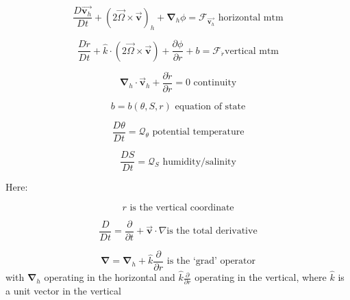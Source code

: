 \documentclass[12pt]{book}
\begin{document}

\begin{equation*}
\frac{D\vec{\mathbf{v}_{h}}}{Dt}+\left( 2\vec{\Omega}\times \vec{\mathbf{v}}
\right) _{h}+\mathbf{\nabla }_{h}\phi =\mathcal{F}_{\vec{\mathbf{v}_{h}}}
\text{ horizontal mtm}
\end{equation*}

\begin{equation*}
\frac{D\dot{r}}{Dt}+\widehat{k}\cdot \left( 2\vec{\Omega}\times \vec{\mathbf{
v}}\right) +\frac{\partial \phi }{\partial r}+b=\mathcal{F}_{\dot{r}}\text{
vertical mtm}
\end{equation*}

\begin{equation}
\mathbf{\nabla }_{h}\cdot \vec{\mathbf{v}}_{h}+\frac{\partial \dot{r}}{
\partial r}=0\text{ continuity}  \label{eq:continuous}
\end{equation}

\begin{equation*}
b=b(\theta ,S,r)\text{ equation of state}
\end{equation*}

\begin{equation*}
\frac{D\theta }{Dt}=\mathcal{Q}_{\theta }\text{ potential temperature}
\end{equation*}

\begin{equation*}
\frac{DS}{Dt}=\mathcal{Q}_{S}\text{ humidity/salinity}
\end{equation*}

Here:

\begin{equation*}
r\text{ is the vertical coordinate}
\end{equation*}

\begin{equation*}
\frac{D}{Dt}=\frac{\partial }{\partial t}+\vec{\mathbf{v}}\cdot \nabla \text{
is the total derivative}
\end{equation*}

\begin{equation*}
\mathbf{\nabla }=\mathbf{\nabla }_{h}+\widehat{k}\frac{\partial }{\partial r}
\text{ is the `grad' operator}
\end{equation*}
with $\mathbf{\nabla }_{h}$ operating in the horizontal and $\widehat{k}
\frac{\partial }{\partial r}$ operating in the vertical, where $\widehat{k}$
is a unit vector in the vertical
\end{document}
